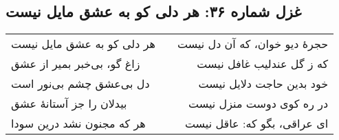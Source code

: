 \begin{center}
\section*{غزل شماره ۳۶: هر دلی کو به عشق مایل نیست}
\label{sec:036}
\begin{longtable}{l p{0.5cm} r}
هر دلی کو به عشق مایل نیست
&&
حجرهٔ دیو خوان، که آن دل نیست
\\
زاغ گو، بی‌خبر بمیر از عشق
&&
که ز گل عندلیب غافل نیست
\\
دل بی‌عشق چشم بی‌نور است
&&
خود بدین حاجت دلایل نیست
\\
بیدلان را جز آستانهٔ عشق
&&
در ره کوی دوست منزل نیست
\\
هر که مجنون نشد درین سودا
&&
ای عراقی، بگو که: عاقل نیست
\\
\end{longtable}
\end{center}
